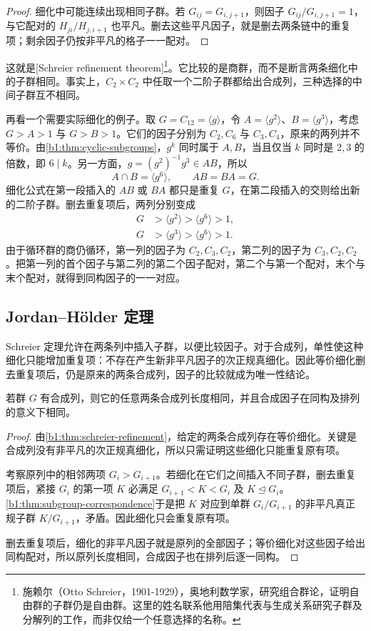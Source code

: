 \begin{proof}
	细化中可能连续出现相同子群。若 \(G_{ij}=G_{i,j+1}\)，则因子 \(G_{ij}/G_{i,j+1}=1\)，与它配对的 \(H_{ji}/H_{j,i+1}\) 也平凡。删去这些平凡因子，就是删去两条链中的重复项；剩余因子仍按非平凡的格子一一配对。
\end{proof}

这就是[Schreier refinement theorem]\footnote{施赖尔（Otto Schreier，1901-1929），奥地利数学家，研究组合群论，证明自由群的子群仍是自由群。这里的姓名联系他用陪集代表与生成关系研究子群及分解列的工作，而非仅给一个任意选择的名称。}。它比较的是商群，而不是断言两条细化中的子群相同。事实上，\(C_2\times C_2\) 中任取一个二阶子群都给出合成列，三种选择的中间子群互不相同。

\ProseParagraphBreak
再看一个需要实际细化的例子。取 \(G=C_{12}=\langle g\rangle\)，令 \(A=\langle g^2\rangle\)、\(B=\langle g^3\rangle\)，考虑 \(G>A>1\) 与 \(G>B>1\)。它们的因子分别为 \(C_2,C_6\) 与 \(C_3,C_4\)，原来的两列并不等价。由\cref{b1:thm:cyclic-subgroups}，\(g^k\) 同时属于 \(A,B\)，当且仅当 \(k\) 同时是 \(2,3\) 的倍数，即 \(6\mid k\)。另一方面，\(g=(g^2)^{-1}g^3\in AB\)，所以
\[
	A\cap B=\langle g^6\rangle,\qquad AB=BA=G.
\]
细化公式在第一段插入的 \(AB\) 或 \(BA\) 都只是重复 \(G\)，在第二段插入的交则给出新的二阶子群。删去重复项后，两列分别变成
\[
	\begin{aligned}
		G&>\langle g^2\rangle>\langle g^6\rangle>1,\\
		G&>\langle g^3\rangle>\langle g^6\rangle>1.
	\end{aligned}
\]
由于循环群的商仍循环，第一列的因子为 \(C_2,C_3,C_2\)，第二列的因子为 \(C_3,C_2,C_2\)。把第一列的首个因子与第二列的第二个因子配对，第二个与第一个配对，末个与末个配对，就得到同构因子的一一对应。

\subsection{Jordan–Hölder 定理}
\label{b1:subsec:0701:03}

Schreier 定理允许在两条列中插入子群，以便比较因子。对于合成列，单性使这种细化只能增加重复项：不存在产生新非平凡因子的次正规真细化。因此等价细化删去重复项后，仍是原来的两条合成列，因子的比较就成为唯一性结论。

\begin{theorem}\label{b1:thm:jordan-holder}
	若群 \(G\) 有合成列，则它的任意两条合成列长度相同，并且合成因子在同构及排列的意义下相同。
\end{theorem}
\begin{proof}
	由\cref{b1:thm:schreier-refinement}，给定的两条合成列存在等价细化。关键是合成列没有非平凡的次正规真细化，所以只需证明这些细化只能重复原有项。

	考察原列中的相邻两项 \(G_i>G_{i+1}\)。若细化在它们之间插入不同子群，删去重复项后，紧接 \(G_i\) 的第一项 \(K\) 必满足 \(G_{i+1}<K<G_i\) 及 \(K\trianglelefteq G_i\)。\cref{b1:thm:subgroup-correspondence}于是把 \(K\) 对应到单群 \(G_i/G_{i+1}\) 的非平凡真正规子群 \(K/G_{i+1}\)，矛盾。因此细化只会重复原有项。

	删去重复项后，细化的非平凡因子就是原列的全部因子；等价细化对这些因子给出同构配对，所以原列长度相同，合成因子也在排列后逐一同构。
\end{proof}

